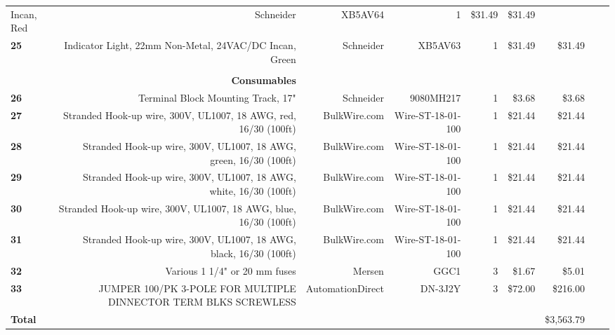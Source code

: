 \begin{table}[!htp]
{\begin{tabular}{lrrrrrrrr}
      Incan, Red              & Schneider         & XB5AV64
      & 1        & \$31.49  & \$31.49        \\
      \textbf{25}    & Indicator Light, 22mm Non-Metal, 24VAC/DC
      Incan, Green            & Schneider         & XB5AV63
      & 1        & \$31.49  & \$31.49        \\
      \textbf{}      &
      &                   &                   &          &          &
      \\
      \textbf{}      & \textbf{Consumables}
      &                   &                   &          &          &
      \\
      \textbf{26}    & Terminal Block Mounting Track, 17"
      & Schneider         & 9080MH217         & 1        & \$3.68   &
      \$3.68         \\
      \textbf{27}    & Stranded Hook-up wire, 300V, UL1007, 18 AWG,
      red, 16/30 (100ft)   & BulkWire.com      & Wire-ST-18-01-100 &
      1        & \$21.44  & \$21.44        \\
      \textbf{28}    & Stranded Hook-up wire, 300V, UL1007, 18 AWG,
      green, 16/30 (100ft) & BulkWire.com      & Wire-ST-18-01-100 &
      1        & \$21.44  & \$21.44        \\
      \textbf{29}    & Stranded Hook-up wire, 300V, UL1007, 18 AWG,
      white, 16/30 (100ft) & BulkWire.com      & Wire-ST-18-01-100 &
      1        & \$21.44  & \$21.44        \\
      \textbf{30}    & Stranded Hook-up wire, 300V, UL1007, 18 AWG,
      blue, 16/30 (100ft)  & BulkWire.com      & Wire-ST-18-01-100 &
      1        & \$21.44  & \$21.44        \\
      \textbf{31}    & Stranded Hook-up wire, 300V, UL1007, 18 AWG,
      black, 16/30 (100ft) & BulkWire.com      & Wire-ST-18-01-100 &
      1        & \$21.44  & \$21.44        \\
      \textbf{32}    & Various 1 1/4" or 20 mm fuses
      & Mersen            & GGC1              & 3        & \$1.67   &
      \$5.01         \\
      \textbf{33}    & JUMPER 100/PK 3-POLE FOR MULTIPLE DINNECTOR
      TERM BLKS SCREWLESS   & AutomationDirect  & DN-3J2Y           &
      3        & \$72.00  & \$216.00       \\
      \textbf{Total} &
      &                   &                   &          &          &
      \$3,563.79     \\
      \bottomrule
    \end{tabular}
  }
\end{table}
